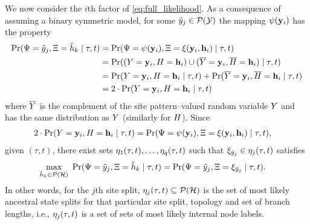 We now consider the $i$th factor of \eqref{eq:full_likelihood}.
As a consequence of assuming a binary symmetric model, for some $\tilde{y}_j\in\mathcal{P}(\mathcal{Y})$ the mapping $\psi(\mathbf{y}_i)$ has the property
\begin{align*}
    \Pr(\Psi=\tilde{y}_j, \Xi=\tilde{h}_k \mid \tau, t) &= \Pr(\Psi=\psi(\mathbf{y}_i), \Xi=\xi(\mathbf{y}_i, \mathbf{h}_i) \mid \tau, t)\\
    &= \Pr((Y=\mathbf{y}_i, H=\mathbf{h}_i) \cup (\overline{Y}=\mathbf{y}_i, \overline{H}=\mathbf{h}_i) \mid \tau, t)\\
    &= \Pr(Y=\mathbf{y}_i, H=\mathbf{h}_i \mid \tau, t) + \Pr(\overline{Y}=\mathbf{y}_i, \overline{H}=\mathbf{h}_i \mid \tau, t)\\
    &= 2\cdot\Pr(Y=\mathbf{y}_i, H=\mathbf{h}_i \mid \tau, t)
\end{align*}
where $\overline{Y}$ is the complement of the site pattern--valued random variable $Y$ and has the same distribution as $Y$ (similarly for $H$).
Since
\begin{align*}
    2\cdot\Pr(Y=\mathbf{y}_i, H=\mathbf{h}_i \mid \tau, t) &= \Pr(\Psi=\psi(\mathbf{y}_i), \Xi=\xi(\mathbf{y}_i, \mathbf{h}_i) \mid \tau, t),
\end{align*}
given $(\tau, t)$, there exist sets $\eta_1(\tau, t),\ldots,\eta_q(\tau, t)$ such that $\xi_{\tilde{y}_j}\in\eta_j(\tau, t)$ satisfies
\begin{align*}
\max_{\ancestralSplit_k\in\mathcal{P}(\ancestralSplitSet)} \ \Pr(\siteSplitRV=\siteSplit_j, \ancestralSplitRV=\ancestralSplit_k \mid \tau, t) &= \Pr(\siteSplitRV=\siteSplit_j, \ancestralSplitRV = \xi_{\siteSplit_j} \mid \tau, t).
\end{align*}
In other words, for the $j$th site split, $\eta_j(\tau, t)\subseteq\mathcal{P}(\mathcal{H})$ is the set of most likely ancestral state splits for that particular site split, topology and set of branch lengths, i.e., $\eta_j(\tau, t)$ is a set of sets of most likely internal node labels.
